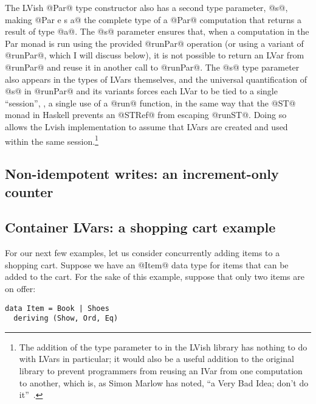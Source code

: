 The LVish @Par@ type constructor also has a second type parameter,
@s@, making @Par e s a@ the complete type of a @Par@ computation that
returns a result of type @a@.  The @s@ parameter ensures that, when a
computation in the Par monad is run using the provided @runPar@
operation (or using a variant of @runPar@, which I will discuss
below), it is not possible to return an LVar from @runPar@ and reuse
it in another call to @runPar@.  The @s@ type parameter also appears
in the types of LVars themselves, and the universal quantification of
@s@ in @runPar@ and its variants forces each LVar to be tied to a
single ``session'', \ie, a single use of a @run@ function, in the same
way that the @ST@ monad in Haskell prevents an @STRef@ from escaping
@runST@.  Doing so allows the Lvish implementation to assume that
LVars are created and used within the same session.\footnote{The
  addition of the  type parameter to  in the LVish
  library has nothing to do with LVars in particular; it would also be
  a useful addition to the original  library to prevent
  programmers from reusing an IVar from one  computation to
  another, which is, as Simon Marlow has noted, ``a Very Bad Idea;
  don't do it''~\cite{marlow-book}.}

\subsection{Non-idempotent writes: an increment-only counter}


\subsection{Container LVars: a shopping cart example}

For our next few examples, let us consider concurrently adding items
to a shopping cart.  Suppose we have an @Item@ data type for items
that can be added to the cart.  For the sake of this example, suppose
that only two items are on offer:

\singlespacing
\begin{lstlisting}
data Item = Book | Shoes
  deriving (Show, Ord, Eq)
\end{lstlisting}
\doublespacing

